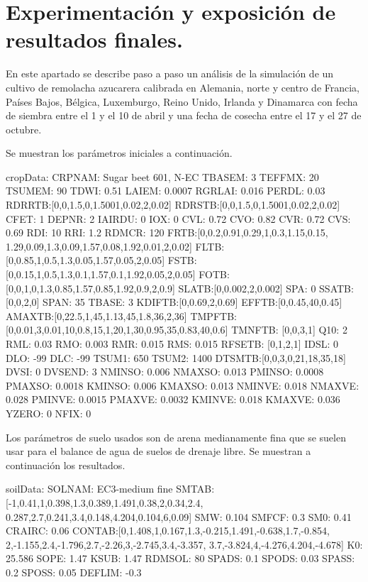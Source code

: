 \section{Experimentación y exposición de resultados finales.} \label{chapter:implementation:results}
En este apartado se describe paso a paso un análisis de la simulación de un cultivo de remolacha azucarera calibrada en Alemania, norte y centro de Francia, Países Bajos, Bélgica, Luxemburgo, Reino Unido, Irlanda y Dinamarca con fecha de siembra entre el 1 y el 10 de abril y una fecha de cosecha entre el 17 y el 27 de octubre. 

Se muestran los parámetros iniciales a continuación.

\begin{python}
cropData:
	CRPNAM: Sugar beet 601, N-EC
	TBASEM: 3
	TEFFMX: 20
	TSUMEM: 90
	TDWI: 0.51
	LAIEM: 0.0007
	RGRLAI: 0.016
	PERDL: 0.03
	RDRRTB:[0,0,1.5,0,1.5001,0.02,2,0.02]
	RDRSTB:[0,0,1.5,0,1.5001,0.02,2,0.02]
	CFET: 1
	DEPNR: 2
	IAIRDU: 0
	IOX: 0
	CVL: 0.72
	CVO: 0.82
	CVR: 0.72
	CVS: 0.69
	RDI: 10
	RRI: 1.2
	RDMCR: 120
	FRTB:[0,0.2,0.91,0.29,1,0.3,1.15,0.15,
			1.29,0.09,1.3,0.09,1.57,0.08,1.92,0.01,2,0.02]
	FLTB:[0,0.85,1,0.5,1.3,0.05,1.57,0.05,2,0.05]
	FSTB:[0,0.15,1,0.5,1.3,0.1,1.57,0.1,1.92,0.05,2,0.05]
	FOTB:[0,0,1,0,1.3,0.85,1.57,0.85,1.92,0.9,2,0.9]
	SLATB:[0,0.002,2,0.002]
	SPA: 0
	SSATB: [0,0,2,0]
	SPAN: 35
	TBASE: 3
	KDIFTB:[0,0.69,2,0.69]
	EFFTB:[0,0.45,40,0.45]
	AMAXTB:[0,22.5,1,45,1.13,45,1.8,36,2,36]
	TMPFTB:[0,0.01,3,0.01,10,0.8,15,1,20,1,30,0.95,35,0.83,40,0.6]
	TMNFTB: [0,0,3,1]
	Q10: 2
	RML: 0.03
	RMO: 0.003
	RMR: 0.015
	RMS: 0.015
	RFSETB: [0,1,2,1]
	IDSL: 0
	DLO: -99
	DLC: -99
	TSUM1: 650
	TSUM2: 1400
	DTSMTB:[0,0,3,0,21,18,35,18]
	DVSI: 0
	DVSEND: 3
	NMINSO: 0.006
	NMAXSO: 0.013
	PMINSO: 0.0008
	PMAXSO: 0.0018
	KMINSO: 0.006
	KMAXSO: 0.013
	NMINVE: 0.018
	NMAXVE: 0.028
	PMINVE: 0.0015
	PMAXVE: 0.0032
	KMINVE: 0.018
	KMAXVE: 0.036
	YZERO: 0
	NFIX: 0
\end{python}

Los parámetros de suelo usados son de arena medianamente fina que se suelen usar para el balance de agua de suelos de drenaje libre. Se muestran a continuación los resultados.

\begin{python}
soilData:
	SOLNAM: EC3-medium fine
	SMTAB:[-1,0.41,1,0.398,1.3,0.389,1.491,0.38,2,0.34,2.4,
			0.287,2.7,0.241,3.4,0.148,4.204,0.104,6,0.09]
	SMW: 0.104
	SMFCF: 0.3
	SM0: 0.41
	CRAIRC: 0.06
	CONTAB:[0,1.408,1,0.167,1.3,-0.215,1.491,-0.638,1.7,-0.854,
			2,-1.155,2.4,-1.796,2.7,-2.26,3,-2.745,3.4,-3.357,
			3.7,-3.824,4,-4.276,4.204,-4.678]
	K0: 25.586
	SOPE: 1.47
	KSUB: 1.47
	RDMSOL: 80
	SPADS: 0.1
	SPODS: 0.03
	SPASS: 0.2
	SPOSS: 0.05
	DEFLIM: -0.3
\end{python}

